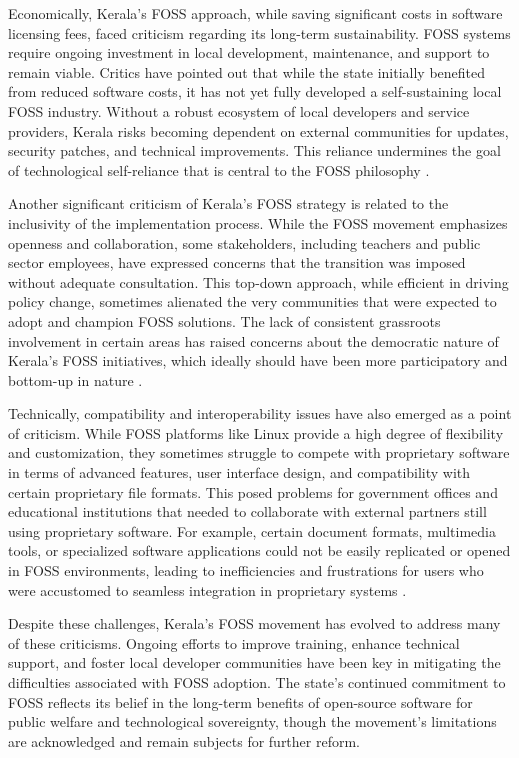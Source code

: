 \begin{refsection}
Economically, Kerala’s FOSS approach, while saving significant costs in software licensing fees, faced criticism regarding its long-term sustainability. FOSS systems require ongoing investment in local development, maintenance, and support to remain viable. Critics have pointed out that while the state initially benefited from reduced software costs, it has not yet fully developed a self-sustaining local FOSS industry. Without a robust ecosystem of local developers and service providers, Kerala risks becoming dependent on external communities for updates, security patches, and technical improvements. This reliance undermines the goal of technological self-reliance that is central to the FOSS philosophy \cite[pp.~11-13]{palackal2007information}.

Another significant criticism of Kerala’s FOSS strategy is related to the inclusivity of the implementation process. While the FOSS movement emphasizes openness and collaboration, some stakeholders, including teachers and public sector employees, have expressed concerns that the transition was imposed without adequate consultation. This top-down approach, while efficient in driving policy change, sometimes alienated the very communities that were expected to adopt and champion FOSS solutions. The lack of consistent grassroots involvement in certain areas has raised concerns about the democratic nature of Kerala's FOSS initiatives, which ideally should have been more participatory and bottom-up in nature \cite[pp.~23-24]{kurup2020freedom}.

Technically, compatibility and interoperability issues have also emerged as a point of criticism. While FOSS platforms like Linux provide a high degree of flexibility and customization, they sometimes struggle to compete with proprietary software in terms of advanced features, user interface design, and compatibility with certain proprietary file formats. This posed problems for government offices and educational institutions that needed to collaborate with external partners still using proprietary software. For example, certain document formats, multimedia tools, or specialized software applications could not be easily replicated or opened in FOSS environments, leading to inefficiencies and frustrations for users who were accustomed to seamless integration in proprietary systems \cite[pp.~45-47]{isaac2000local}.

Despite these challenges, Kerala’s FOSS movement has evolved to address many of these criticisms. Ongoing efforts to improve training, enhance technical support, and foster local developer communities have been key in mitigating the difficulties associated with FOSS adoption. The state’s continued commitment to FOSS reflects its belief in the long-term benefits of open-source software for public welfare and technological sovereignty, though the movement’s limitations are acknowledged and remain subjects for further reform.


\end{refsection}
